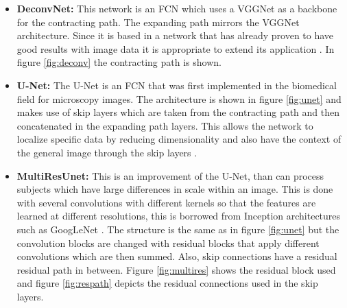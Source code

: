 \begin{itemize}
    \item \textbf{DeconvNet:} This network is an FCN which uses a VGGNet \cite{vggnet} as a backbone for the contracting path. The expanding path mirrors the VGGNet architecture. Since it is based in a network that has already proven to have good results with image data it is appropriate to extend its application \cite{vggnet, Noh}. In figure \ref{fig:deconv} the contracting path is shown.

    \item \textbf{U-Net:} The U-Net is an FCN that was first implemented in the biomedical field for microscopy images. The architecture is shown in figure \ref{fig:unet} and makes use of skip layers which are taken from the contracting path and then concatenated in the expanding path layers. This allows the network to localize specific data by reducing dimensionality and also have the context of the general image through the skip layers \cite{Ronneberger}.
    


    \item \textbf{MultiResUnet:} This is an improvement of the U-Net, than can process subjects which have large differences in scale within an image. This is done with several convolutions with different kernels so that the features are learned at different resolutions, this is borrowed from Inception architectures such as GoogLeNet \cite{inception}. The structure is the same as in figure \ref{fig:unet} but the convolution blocks are changed with residual blocks that apply different convolutions which are then summed. Also, skip connections have a residual residual path in between. Figure \ref{fig:multires} shows the residual block used and figure \ref{fig:respath} depicts the residual connections used in the skip layers.
\end{itemize}

